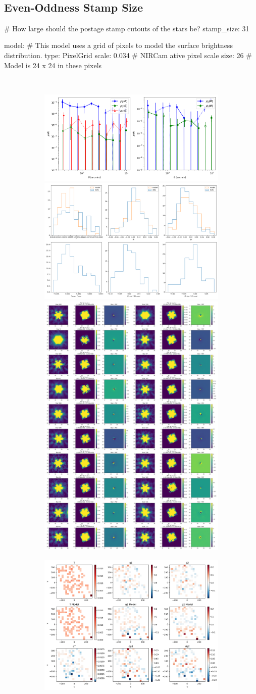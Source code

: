 \documentclass[a4 paper]{article}
\numberwithin{equation}{section}
\newcommand{\0}{\mathbf{0}}
\begin{document}
\\ \clearpage \subsection{Even-Oddness Stamp Size} 
\begin{python}
# How large should the postage stamp cutouts of the stars be?
    stamp_size: 31

model:
    # This model uses a grid of pixels to model the surface brightness distribution.
    type: PixelGrid
    scale: 0.034      # NIRCam ative pixel scale
    size: 26          # Model is 24 x 24 in these pixels
\end{python}\\

\begin{figure}[!h]
  \begin{subfigure}{\linewidth}
  \includegraphics[width=.3\linewidth]{277wStampOdd/piff_rho.png}\hfill
  \includegraphics[width=.3\linewidth]{277wStampOdd/piff_shapes.png}\hfill
  \includegraphics[width=.3\linewidth]{277wStampOdd/piff_stars.png}
  \end{subfigure}\par\medskip
  \begin{subfigure}{\linewidth}
  \includegraphics[width=.3\linewidth]{277wStampOdd/piff_twod.png}\hfill

\end{subfigure}
\end{figure}
\end{document}
